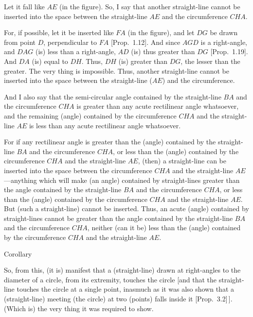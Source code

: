 \begin{Parallel}{}{}
{Let it fall like $AE$ (in the figure). So, I say that another straight-line cannot
be inserted into the space between the straight-line $AE$ and the
circumference $CHA$.

For, if possible, let it be inserted like $FA$ (in the figure), and let $DG$ 
be drawn from point $D$, perpendicular to $FA$ [Prop.~1.12]. And since $AGD$ is a right-angle, and
 $DAG$ (is) less than a right-angle, $AD$ (is) thus greater than $DG$  [Prop.~1.19]. And $DA$ (is) equal to $DH$. Thus, $DH$ (is)
greater than $DG$, the lesser than the greater. The very thing is impossible.
Thus, another straight-line cannot be inserted into the space between the
straight-line ($AE$) and the circumference.

\epsfysize=2in
\centerline{}

And I also say that the  semi-circular angle  contained by the straight-line
$BA$ and the circumference $CHA$ is greater than any acute rectilinear angle whatsoever,
and the remaining (angle) contained by the circumference $CHA$ and the straight-line
$AE$ is less than any acute rectilinear angle whatsoever.

For if any rectilinear angle is greater than the (angle) contained by the
straight-line $BA$ and the circumference $CHA$, or  less than the (angle)
contained by the circumference $CHA$ and the straight-line $AE$, (then)
a straight-line can be inserted into the space between the circumference 
$CHA$ and the straight-line $AE$---anything which will make (an angle)
contained by straight-lines greater than the angle contained by the straight-line $BA$ and the circumference $CHA$, or less than the (angle) contained 
by the circumference $CHA$ and the straight-line $AE$. But (such a straight-line)
cannot be inserted. Thus, an acute (angle) contained by straight-lines
cannot be greater than the angle contained by the straight-line $BA$ and
the circumference $CHA$, neither (can it be) less than the (angle) contained by
the circumference $CHA$ and the straight-line $AE$.\\

\begin{center}
{\large Corollary}
\end{center}\vspace*{-7pt}

So, from this, (it is) manifest that a (straight-line) drawn at right-angles
to the diameter of a circle, from its extremity, touches the circle [and that the
straight-line  touches the circle at a single point, inasmuch as it was also
shown that a (straight-line) meeting (the circle) at two (points) falls inside it [Prop.~3.2]\,]. (Which is) the very thing it was required to show. }
\end{Parallel}

